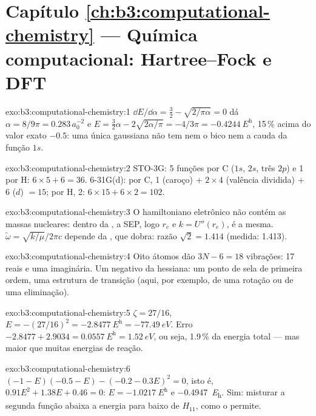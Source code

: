 \section*{Capítulo \ref{ch:b3:computational-chemistry} --- Química computacional: Hartree--Fock e DFT}

\begin{solution}{exo:b3:computational-chemistry:1}
$\dd E/\dd\alpha = \frac32 - \sqrt{2/\pi\alpha} = 0$ dá $\alpha = 8/9\pi = 0.283\,
a_0^{-2}$ e $E = \frac32\alpha - 2\sqrt{2\alpha/\pi} = -4/3\pi = \qty{-0.4244}{\hartree}$,
15\,\% acima do valor exato $-0.5$: uma única gaussiana não tem nem o bico nem
a cauda da função $1s$.
\end{solution}

\begin{solution}{exo:b3:computational-chemistry:2}
STO-3G: 5 funções por C ($1s$, $2s$, três $2p$) e 1 por H: $6 \times 5 + 6 =
36$. 6-31G(d): por C, 1 (caroço) + $2 \times 4$ (valência dividida) + 6 ($d$) $= 15$;
por H, 2: $6 \times 15 + 6 \times 2 = 102$.
\end{solution}

\begin{solution}{exo:b3:computational-chemistry:3}
O hamiltoniano eletrônico não contém as massas nucleares: dentro da
, a SEP, logo $r_e$ e $k = U''(r_e)$, é a
mesma. $\tilde\omega = \sqrt{k/\mu}/2\pi c$ depende da , que
dobra: razão $\sqrt2 = 1.414$ (medida: 1.413).
\end{solution}

\begin{solution}{exo:b3:computational-chemistry:4}
Oito átomos dão $3N - 6 = 18$ vibrações: 17 reais e uma imaginária. Um
 negativo da hessiana: um ponto de sela de primeira ordem, uma
estrutura de transição (aqui, por exemplo, de uma rotação ou de uma eliminação).
\end{solution}

\begin{solution}{exo:b3:computational-chemistry:5}
$\zeta = 27/16$, $E = -(27/16)^2 = \qty{-2.8477}{\hartree} = \qty{-77.49}{eV}$.
Erro $-2.8477 + 2.9034 = \qty{0.0557}{\hartree} = \qty{1.52}{eV}$, ou seja,
1.9\,\% da energia total --- mas maior que muitas energias de reação.
\end{solution}

\begin{solution}{exo:b3:computational-chemistry:6}
$(-1 - E)(-0.5 - E) - (-0.2 - 0.3E)^2 = 0$, isto é, $0.91E^2 + 1.38E + 0.46 = 0$:
$E = \qty{-1.0217}{\hartree}$ e \qty{-0.4947}{\hartree}. Sim: misturar a
segunda função abaixa a energia para baixo de $H_{11}$, como o  permite.
\end{solution}

